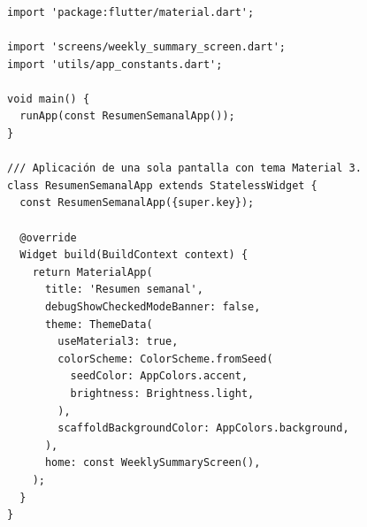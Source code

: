 \documentclass[12pt,a4paper]{article}
\newcommand{\codigo}[1]{\texttt{\detokenize{#1}}}
\begin{document}
\subsubsection*{\codigo{lib/main.dart}}
\begin{lstlisting}
import 'package:flutter/material.dart';

import 'screens/weekly_summary_screen.dart';
import 'utils/app_constants.dart';

void main() {
  runApp(const ResumenSemanalApp());
}

/// Aplicación de una sola pantalla con tema Material 3.
class ResumenSemanalApp extends StatelessWidget {
  const ResumenSemanalApp({super.key});

  @override
  Widget build(BuildContext context) {
    return MaterialApp(
      title: 'Resumen semanal',
      debugShowCheckedModeBanner: false,
      theme: ThemeData(
        useMaterial3: true,
        colorScheme: ColorScheme.fromSeed(
          seedColor: AppColors.accent,
          brightness: Brightness.light,
        ),
        scaffoldBackgroundColor: AppColors.background,
      ),
      home: const WeeklySummaryScreen(),
    );
  }
}

\end{lstlisting}
\end{document}
